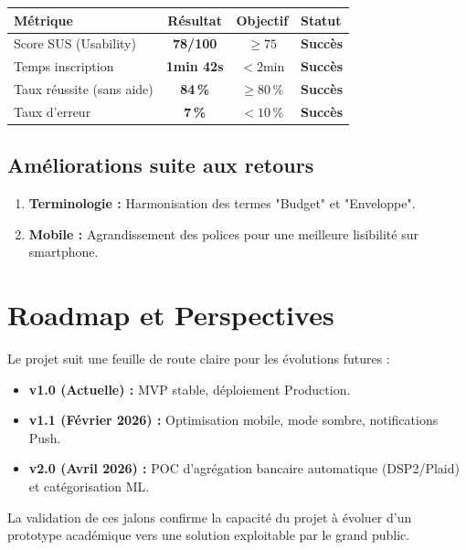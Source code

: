 \begin{center}
\begin{tabular}{|l|c|c|l|}
\hline
\textbf{Métrique} & \textbf{Résultat} & \textbf{Objectif} & \textbf{Statut} \\
\hline
Score SUS (Usability) & \textbf{78/100} & $\geq 75$ & \textcolor{green!60!black}{\textbf{Succès}} \\
\hline
Temps inscription & \textbf{1min 42s} & $< 2$min & \textcolor{green!60!black}{\textbf{Succès}} \\
\hline
Taux réussite (sans aide) & \textbf{84\,\%} & $\geq 80\,\%$ & \textcolor{green!60!black}{\textbf{Succès}} \\
\hline
Taux d'erreur & \textbf{7\,\%} & $< 10\,\%$ & \textcolor{green!60!black}{\textbf{Succès}} \\
\hline
\end{tabular}
\end{center}

\subsection{Améliorations suite aux retours}
\begin{enumerate}
    \item \textbf{Terminologie :} Harmonisation des termes "Budget" et "Enveloppe".
    \item \textbf{Mobile :} Agrandissement des polices pour une meilleure lisibilité sur smartphone.
\end{enumerate}

\section{Roadmap et Perspectives}

Le projet suit une feuille de route claire pour les évolutions futures :

\begin{itemize}
    \item \textbf{v1.0 (Actuelle) :} MVP stable, déploiement Production.
    \item \textbf{v1.1 (Février 2026) :} Optimisation mobile, mode sombre, notifications Push.
    \item \textbf{v2.0 (Avril 2026) :} POC d'agrégation bancaire automatique (DSP2/Plaid) et catégorisation ML.
\end{itemize}

La validation de ces jalons confirme la capacité du projet à évoluer d'un prototype académique vers une solution exploitable par le grand public.
